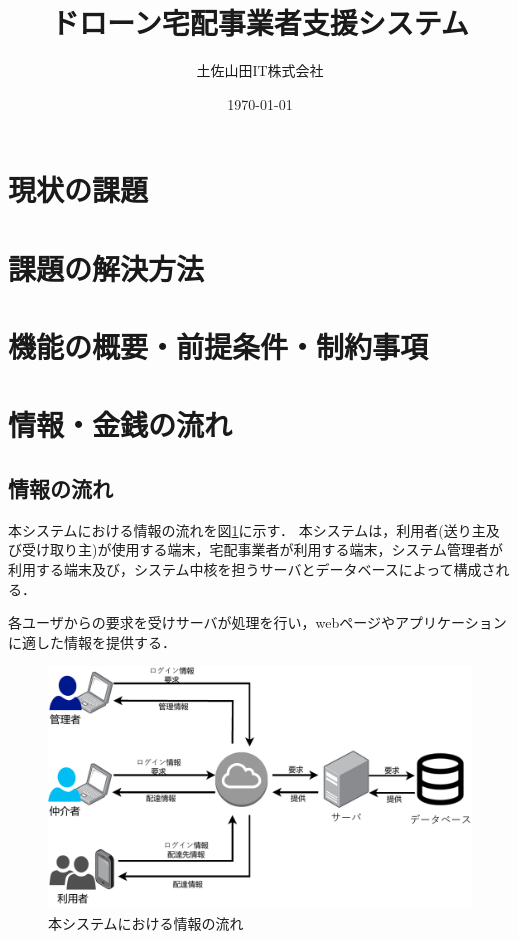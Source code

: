 \documentclass[a4paper, titlepage]{jsarticle}
\date{\today}
\title{ドローン宅配事業者支援システム}
\author{土佐山田IT株式会社}
\begin{document}
\maketitle

\tableofcontents

\clearpage

\section{現状の課題}

\section{課題の解決方法}

\section{機能の概要・前提条件・制約事項}

\section{情報・金銭の流れ}

\subsection{情報の流れ}
本システムにおける情報の流れを図\ref{fig:info_flow_1}に示す．
本システムは，利用者(送り主及び受け取り主)が使用する端末，宅配事業者が利用する端末，システム管理者が利用する端末及び，システム中核を担うサーバとデータベースによって構成される．

各ユーザからの要求を受けサーバが処理を行い，webページやアプリケーションに適した情報を提供する．

\begin{figure}[H]
  \centering
  \includegraphics[width=0.6\linewith]{./info_flow.pdf}
  \caption{本システムにおける情報の流れ}
  \label{fig:info_flow_1}
\end{figure}
\end{document}
